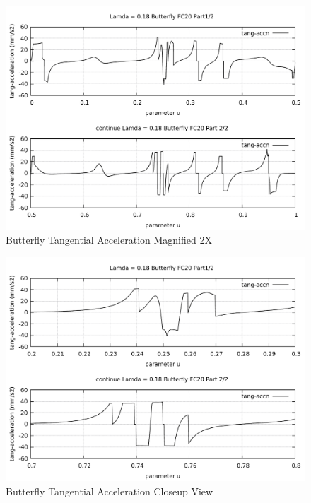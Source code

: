 \clearpage
\pagebreak
\begin{landscape}
	\begin{figure}
		\centering
		\caption  {Butterfly Tangential Acceleration Magnified 2X}
		\label{img-Butterfly Tangential Acceleration Magnified 2X}
		\includegraphics[width=1.30\textwidth]{Chap4/Lamda/magnify/Butterfly-Tang-Accn-Lamda-magnified-01.pdf} 
	\end{figure}
\end{landscape}

\clearpage
\pagebreak
\begin{landscape}
	\begin{figure}
		\centering
		\caption  {Butterfly Tangential Acceleration Closeup View}
		\label{img-Butterfly Tangential Acceleration Closeup View}
		\includegraphics[width=1.30\textwidth]{Chap4/Lamda/magnify/Butterfly-Tang-Accn-Lamda-magnified-02.pdf} 
	\end{figure}
\end{landscape}

